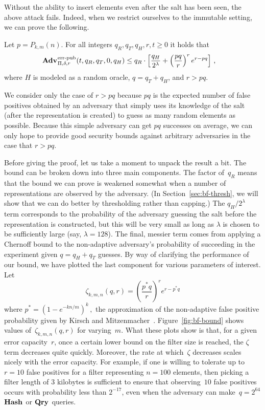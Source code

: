 Without the ability to insert elements even after the salt has been seen, the
above attack fails. Indeed, when we restrict ourselves to the immutable setting,
we can prove the following.
%
\begin{theorem}\label{thm:sbf-errep-immutable}
  Let $p=P_{k,m}(n)$.  For all integers $q_R, q_T, q_H, r, t \geq 0$ it holds
  that
  \begin{equation*}
    \begin{aligned}
            \Adv{\errep}_{\Pi,\delta,r}(t,\,&q_R,q_T,0,q_H) \leq q_R \cdot \left[\frac{q_H}{2^\lambda} +
        \left(\frac{pq}{r}\right)^re^{r-pq}\right] \,,
    \end{aligned}
  \end{equation*}
  where $H$ is modeled as a random oracle, $q = q_T + q_H$, and
  $r > pq$.
\end{theorem}
We consider only the case of $r > pq$ because $pq$ is the expected number of
false positives obtained by an adversary that simply uses its knowledge of the
salt (after the representation is created) to guess as many random elements as
possible. Because this simple adversary can get $pq$ successes on average, we
can only hope to provide good security bounds against arbitrary adversaries in
the case that $r > pq$.

Before giving the proof, let us take a moment to unpack the result a bit.  The
bound can be broken down into three main components. The factor
of~$q_R$ means that the bound we can prove is weakened somewhat when a number of
representations are observed by the adversary. (In Section~\ref{sec:bf-thresh},
we will show that we can do better by thresholding rather than capping.) The $q_H/2^\lambda$ term
corresponds to the probability of the adversary guessing the salt before the
representation is constructed, but this will be very small as long as $\lambda$
is chosen to be sufficiently large (say, $\lambda=128$). The final, messier term
comes from applying a Chernoff bound to the non-adaptive adversary's probability
of succeeding in the experiment given $q = q_H+q_T$ guesses.
%
By way of clarifying the performance of our bound, we have plotted the last
component for various parameters of interest. Let
%
\begin{equation}\label{eq:zeta}
  \zeta_{k,m,n}(q,r) = \left(\frac{p^*q}{r}\right)^re^{r-p^*q}
\end{equation}
%
where
$
  p^* = (1-e^{-kn/m})^k \,,
$
the approximation of the non-adaptive false positive probability given by Kirsch
and Mitzenmacher~\cite{kirsch2006less}.
%
Figure~\ref{fig:bf-bound} shows values
of~$\zeta_{k,m,n}(q,r)$ for varying~$m$.
%
What these plots show is that, for a given error capacity~$r$, once a certain lower
bound on the filter size is reached, the $\zeta$ term decreases quite quickly.
Moreover, the rate at which~$\zeta$ decreases scales nicely with the error
capacity.  For example, if one is willing to tolerate up to~$r=10$ false
positives for a filter representing $n=100$ elements, then picking a filter
length of $3$ kilobytes is sufficient to ensure that observing~$10$ false
positives occurs with probability less than $2^{-17}$, even when the adversary
can make~$q =2^{64}$ $\textup{\textbf{Hash}}\hspace{0.5pt}$ or $\textup{\textbf{Qry}}\hspace{0.5pt}$ queries.

